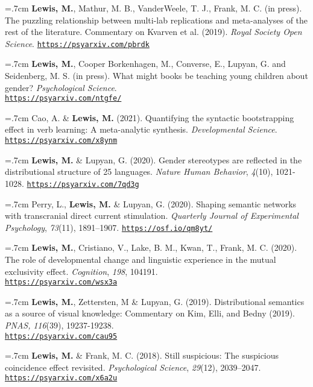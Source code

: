 \documentclass[letterpaper]{article}
\begin{document}
\hangindent=.7cm {\bf Lewis, M.}, Mathur, M. B., VanderWeele, T. J., Frank, M. C. (in press). The puzzling relationship between multi-lab replications and meta-analyses of the rest of the literature. Commentary on Kvarven et al. (2019).  {\it Royal Society Open Science}. \href{https://psyarxiv.com/pbrdk}{\tt https://psyarxiv.com/pbrdk}



\hangindent=.7cm {\bf Lewis, M.}, Cooper Borkenhagen, M., Converse, E., Lupyan, G. and Seidenberg, M. S. (in press). What might books be teaching young children about gender? {\it Psychological Science}. \\ \href{https://psyarxiv.com/ntgfe/}{\tt https://psyarxiv.com/ntgfe/}

\hangindent=.7cm Cao, A. \& {\bf Lewis, M.} (2021). Quantifying the syntactic bootstrapping effect in verb learning: A meta-analytic synthesis.  {\it Developmental Science}. \href{https://psyarxiv.com/x8ynm}{\tt https://psyarxiv.com/x8ynm}


\hangindent=.7cm {\bf Lewis, M.} \& Lupyan, G. (2020). Gender stereotypes are reflected in the distributional structure of 25 languages.  {\it Nature Human Behavior}, {\it 4}(10), 1021-1028. \href{https://psyarxiv.com/7qd3g}{\tt https://psyarxiv.com/7qd3g}

\hangindent=.7cm Perry, L., {\bf Lewis, M.} \& Lupyan, G. (2020). Shaping semantic networks with transcranial direct current stimulation. {\it Quarterly Journal of Experimental Psychology},  {\it 73}(11), 1891–1907. \href{https://osf.io/qm8yt/}{\tt https://osf.io/qm8yt/}


\hangindent=.7cm {\bf Lewis, M.}, Cristiano, V., Lake, B. M., Kwan, T., Frank, M. C. (2020). The role of developmental change and linguistic experience in the mutual exclusivity effect. {\it Cognition}, {\it 198}, 104191. \\ \href{https://psyarxiv.com/wsx3a}{\tt https://psyarxiv.com/wsx3a}


\hangindent=.7cm {\bf Lewis, M.}, Zettersten, M \& Lupyan, G. (2019).  Distributional semantics as a source of visual knowledge: Commentary on Kim, Elli, and Bedny (2019).  {\it PNAS,} {\it 116}(39), 19237-19238. \\ \href{https://psyarxiv.com/cau95}{\tt https://psyarxiv.com/cau95}

\hangindent=.7cm {\bf Lewis, M.} \& Frank, M. C. (2018). Still suspicious: The suspicious coincidence effect revisited.  {\it Psychological Science}, {\it 29}(12), 2039--2047. \href{https://psyarxiv.com/x6a2u}{\tt https://psyarxiv.com/x6a2u}
\end{document}
